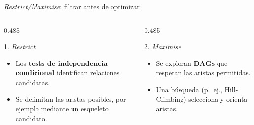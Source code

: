 \documentclass[aspectratio=169,11pt]{beamer}
\begin{document}

\begin{frame}[t]{\textit{Restrict/Maximise}: filtrar antes de optimizar}
  \vspace{-0.42cm}
  \small
  \begin{columns}[T,onlytextwidth]
    \begin{column}{0.485\textwidth}
      \begin{block}{1. \textit{Restrict}}
        \begin{itemize}
          \item Los \textbf{tests de independencia condicional} identifican relaciones candidatas.
          \item Se delimitan las aristas posibles, por ejemplo mediante un \alert{esqueleto candidato}.
        \end{itemize}
        \vspace{0.02cm}
        \begin{center}
        \end{center}
      \end{block}
    \end{column}
    \begin{column}{0.485\textwidth}
      \begin{block}{2. \textit{Maximise}}
        \begin{itemize}
          \item Se exploran \textbf{DAGs} que respetan las aristas permitidas.
          \item Una búsqueda (p.~ej., Hill-Climbing) \alert{selecciona y orienta} aristas.
        \end{itemize}
        \vspace{0.02cm}
        \begin{center}

\end{center}
\end{block}
\end{column}
\end{columns}
\end{frame}
\end{document}
